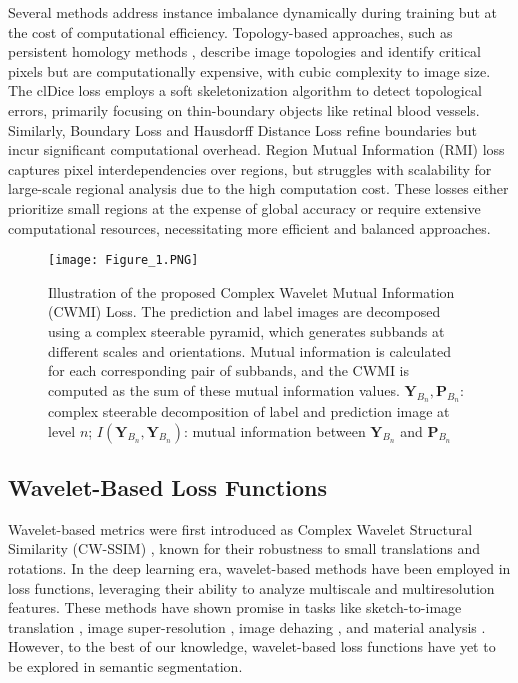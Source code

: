 Several methods address instance imbalance dynamically during training but at the cost of computational efficiency. Topology-based approaches, such as persistent homology methods \cite{stucki2023topologically,oner2023persistent}, describe image topologies and identify critical pixels but are computationally expensive, with cubic complexity to image size. The clDice loss \cite{shit2021cldice} employs a soft skeletonization algorithm to detect topological errors, primarily focusing on thin-boundary objects like retinal blood vessels. Similarly, Boundary Loss \cite{kervadec2019boundary} and Hausdorff Distance Loss \cite{karimi2019reducing} refine boundaries but incur significant computational overhead. Region Mutual Information (RMI) loss \cite{zhao2019region} captures pixel interdependencies over regions, but struggles with scalability for large-scale regional analysis due to the high computation cost. These losses either prioritize small regions at the expense of global accuracy or require extensive computational resources, necessitating more efficient and balanced approaches.


\begin{figure*}
    \centering
    \texttt{[image: Figure\_1.PNG]}
    \vspace{-10pt}
    \caption{Illustration of the proposed Complex Wavelet Mutual Information (CWMI) Loss. The prediction and label images are decomposed using a complex steerable pyramid, which generates subbands at different scales and orientations. Mutual information is calculated for each corresponding pair of subbands, and the CWMI is computed as the sum of these mutual information values. \(\mathbf{Y}_{B_n},\mathbf{P}_{B_n}\): complex steerable decomposition of label and prediction image at level \(n\); \(I(\mathbf{Y}_{B_n}, \mathbf{Y}_{B_n})\): mutual information between \(\mathbf{Y}_{B_n}\) and \(\mathbf{P}_{B_n}\)}
    \label{fig:schematic}
\end{figure*}

\subsection{Wavelet-Based Loss Functions}

Wavelet-based metrics were first introduced as Complex Wavelet Structural Similarity (CW-SSIM) \cite{sampat2009complex}, known for their robustness to small translations and rotations. In the deep learning era, wavelet-based methods have been employed in loss functions, leveraging their ability to analyze multiscale and multiresolution features. These methods have shown promise in tasks like sketch-to-image translation \cite{kim2023whfl}, image super-resolution \cite{korkmaz2024training}, image dehazing \cite{yang2020net}, and material analysis \cite{prantl2022wavelet}. However, to the best of our knowledge, wavelet-based loss functions have yet to be explored in semantic segmentation.

